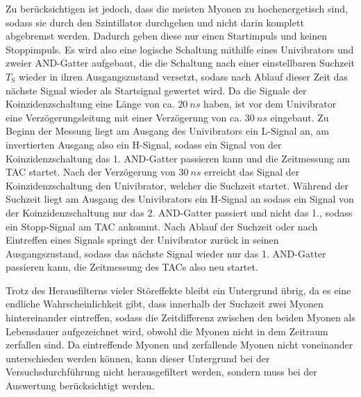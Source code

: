 Zu berücksichtigen ist jedoch, dass die meisten Myonen zu hochenergetisch sind, sodass sie durch den Szintillator durchgehen und nicht darin komplett abgebremst werden. Dadurch geben diese
nur einen Startimpuls und keinen Stoppimpuls. Es wird also eine logische Schaltung mithilfe eines Univibrators und zweier AND-Gatter aufgebaut, die die Schaltung nach einer einstellbaren
Suchzeit $T_\text{S}$ wieder in ihren Ausgangszustand versetzt, sodass nach Ablauf dieser Zeit das nächste Signal wieder als Startsignal gewertet wird. Da die Signale der Koinzidenzschaltung
eine Länge von ca. $\SI{20}{ns}$ haben, ist vor dem Univibrator eine Verzögerungsleitung mit einer Verzögerung von ca. $\SI{30}{ns}$ eingebaut.
Zu Beginn der Messung liegt am Ausgang des Univibrators ein L-Signal an, am invertierten Ausgang also ein H-Signal, sodass ein Signal von der Koinzidenzschaltung das 1. AND-Gatter passieren kann
und die Zeitmessung am TAC startet. Nach der Verzögerung von $\SI{30}{ns}$ erreicht das Signal der Koinzidenzschaltung den Univibrator, welcher die Suchzeit startet. Während der Suchzeit liegt
am Ausgang des Univibrators ein H-Signal an sodass ein Signal von der Koinzidenzschaltung nur das 2. AND-Gatter passiert und nicht das 1., sodass ein Stopp-Signal am TAC ankommt. Nach Ablauf der
Suchzeit oder nach Eintreffen eines Signals springt der Univibrator zurück in seinen Ausgangszustand, sodass das nächste Signal wieder nur das 1. AND-Gatter passieren kann, die Zeitmessung des TACs
also neu startet.

Trotz des Herausfilterns vieler Störeffekte bleibt ein Untergrund übrig, da es eine endliche Wahrscheinlichkeit gibt, dass innerhalb der Suchzeit zwei Myonen hintereinander eintreffen, sodass
die Zeitdifferenz zwischen den beiden Myonen als Lebensdauer aufgezeichnet wird, obwohl die Myonen nicht in dem Zeitraum zerfallen sind. Da eintreffende Myonen und zerfallende Myonen nicht voneinander
unterschieden werden können, kann dieser Untergrund bei der Versuchsdurchführung nicht herausgefiltert werden, sondern muss bei der Auswertung berücksichtigt werden.

